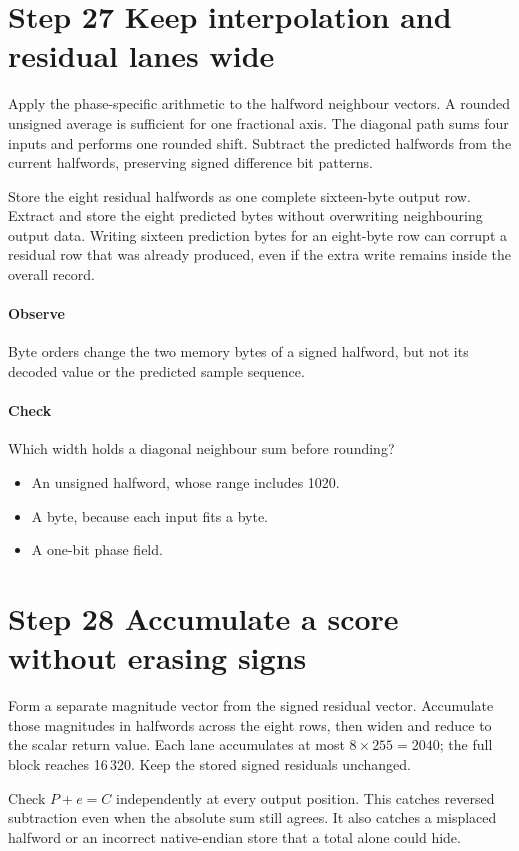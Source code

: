 \section{Step 27 Keep interpolation and residual lanes wide}\label{h263-prediction-s07}
Apply the phase-specific arithmetic to the halfword neighbour vectors. A rounded
unsigned average is sufficient for one fractional axis. The diagonal path sums
four inputs and performs one rounded shift. Subtract the predicted halfwords
from the current halfwords, preserving signed difference bit patterns.

Store the eight residual halfwords as one complete sixteen-byte output row.
Extract and store the eight predicted bytes without overwriting neighbouring
output data. Writing sixteen prediction bytes for an eight-byte row can corrupt
a residual row that was already produced, even if the extra write remains inside
the overall record.

\paragraph{Observe} Byte orders change the two memory bytes of a signed
halfword, but not its decoded value or the predicted sample sequence.
\paragraph{Check} Which width holds a diagonal neighbour sum before rounding?
\begin{itemize}
  \item[A.] An unsigned halfword, whose range includes 1020.
  \item[B.] A byte, because each input fits a byte.
  \item[C.] A one-bit phase field.
\end{itemize}

\section{Step 28 Accumulate a score without erasing signs}\label{h263-prediction-s08}
Form a separate magnitude vector from the signed residual vector. Accumulate
those magnitudes in halfwords across the eight rows, then widen and reduce to
the scalar return value. Each lane accumulates at most $8\times255=2040$;
the full block reaches 16\,320. Keep the stored signed residuals unchanged.

Check $P+e=C$ independently at every output position. This catches reversed
subtraction even when the absolute sum still agrees. It also catches a misplaced
halfword or an incorrect native-endian store that a total alone could hide.

